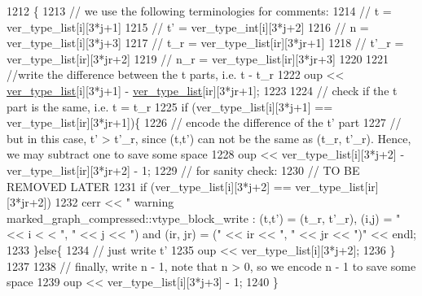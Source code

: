 \begin{DoxyCode}
1212                                                                                             \{
1213   \textcolor{comment}{// we use the following terminologies for comments:}
1214   \textcolor{comment}{// t = ver\_type\_list[i][3*j+1]}
1215   \textcolor{comment}{// t' = ver\_type\_int[i][3*j+2]}
1216   \textcolor{comment}{// n = ver\_type\_list[i][3*j+3]}
1217   \textcolor{comment}{// t\_r = ver\_type\_list[ir][3*jr+1]}
1218   \textcolor{comment}{// t'\_r = ver\_type\_list[ir][3*jr+2]}
1219   \textcolor{comment}{// n\_r = ver\_type\_list[ir][3*jr+3]}
1220 
1221   \textcolor{comment}{//write the difference between the t parts, i.e. t - t\_r}
1222   oup << \hyperlink{classmarked__graph__compressed_af2e3e55223d436628a02758dfae88493}{ver\_type\_list}[i][3*j+1] - \hyperlink{classmarked__graph__compressed_af2e3e55223d436628a02758dfae88493}{ver\_type\_list}[ir][3*jr+1];
1223 
1224   \textcolor{comment}{// check if the t part is the same, i.e. t = t\_r}
1225   \textcolor{keywordflow}{if} (ver\_type\_list[i][3*j+1] == ver\_type\_list[ir][3*jr+1])\{
1226     \textcolor{comment}{// encode the difference of the t' part}
1227     \textcolor{comment}{// but in this case, t' > t'\_r, since (t,t') can not be the same as (t\_r, t'\_r). Hence, we may subtract
       one to save some space}
1228     oup << ver\_type\_list[i][3*j+2] - ver\_type\_list[ir][3*jr+2] - 1;
1229     \textcolor{comment}{// for sanity check:}
1230     \textcolor{comment}{// TO BE REMOVED LATER}
1231     \textcolor{keywordflow}{if} (ver\_type\_list[i][3*j+2] == ver\_type\_list[ir][3*jr+2])
1232       cerr << \textcolor{stringliteral}{" warning marked\_graph\_compressed::vtype\_block\_write : (t,t') = (t\_r, t'\_r), (i,j) = "} << i <
      < \textcolor{stringliteral}{", "} << j << \textcolor{stringliteral}{") and (ir, jr) = ("} << ir << \textcolor{stringliteral}{", "} << jr << \textcolor{stringliteral}{")"} << endl;
1233   \}\textcolor{keywordflow}{else}\{
1234     \textcolor{comment}{// just write t'}
1235     oup << ver\_type\_list[i][3*j+2];
1236   \}
1237 
1238   \textcolor{comment}{// finally, write n - 1, note that n > 0, so we encode n - 1 to save some space}
1239   oup << ver\_type\_list[i][3*j+3] - 1;
1240 \}
\end{DoxyCode}
\mbox{\label{classmarked__graph__compressed_af29f16cbd56583652118eb24a7c233b7}} 

